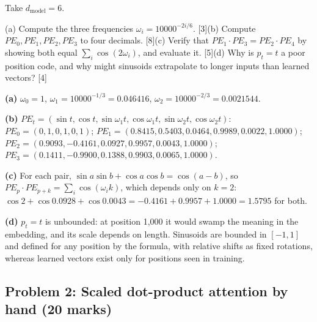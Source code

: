 \documentclass[11pt]{article}
\begin{document}
\begin{prob}Take $d_{\text{model}}=6$.

(a) Compute the three frequencies $\omega_i=10000^{-2i/6}$. [3]\newline (b) Compute $PE_0,PE_1,PE_2,PE_3$ to four decimals. [8]\newline (c) Verify that $PE_1\cdot PE_3=PE_2\cdot PE_4$ by showing both equal $\sum_i\cos(2\omega_i)$, and evaluate it. [5]\newline (d) Why is $p_t=t$ a poor position code, and why might sinusoids extrapolate to longer inputs than learned vectors? [4]\end{prob}

\begin{soln}\textbf{(a)} $\omega_0=1$, $\omega_1=10000^{-1/3}=0.046416$, $\omega_2=10000^{-2/3}=0.0021544$.

\textbf{(b)} $PE_t=(\sin t,\cos t,\sin\omega_1t,\cos\omega_1t,\sin\omega_2t,\cos\omega_2t)$: $PE_0=(0,1,0,1,0,1)$; $PE_1=(0.8415,0.5403,0.0464,0.9989,0.0022,1.0000)$; $PE_2=(0.9093,-0.4161,0.0927,0.9957,0.0043,1.0000)$; $PE_3=(0.1411,-0.9900,0.1388,0.9903,0.0065,1.0000)$.

\textbf{(c)} For each pair, $\sin a\sin b+\cos a\cos b=\cos(a-b)$, so $PE_p\cdot PE_{p+k}=\sum_i\cos(\omega_ik)$, which depends only on $k=2$: $\cos2+\cos0.0928+\cos0.0043=-0.4161+0.9957+1.0000=\mathbf{1.5795}$ for both.

\textbf{(d)} $p_t=t$ is unbounded: at position 1,000 it would swamp the meaning in the embedding, and its scale depends on length. Sinusoids are bounded in $[-1,1]$ and defined for any position by the formula, with relative shifts as fixed rotations, whereas learned vectors exist only for positions seen in training.\end{soln}

\subsection{Problem 2: Scaled dot-product attention by hand \normalfont\small\color{GreyN}(20 marks)}
\end{document}

